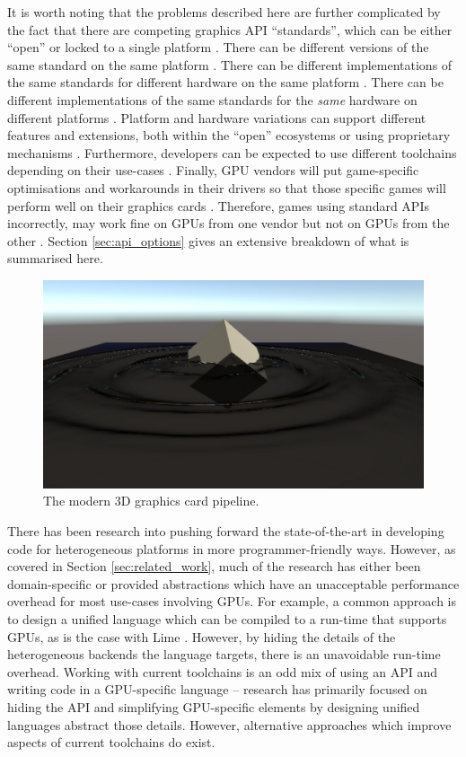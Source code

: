 \documentclass[a4paper,12pt,twoside,openright]{report}
\begin{document}
It is worth noting that the problems described here are further complicated by
the fact that there are competing graphics API ``standards'', which can be
either ``open'' \cite{OpenGL} \cite{Vulkan} or locked to a single platform
\cite{Direct3D} \cite{Metal}. There can be different versions of the same
standard on the same platform \cite{OpenGLHistory}. There can be different
implementations of the same standards for different hardware on the same
platform \cite{NVIDIADrivers} \cite{NVIDIADrivers}. There can be different
implementations of the same standards for the \textit{same} hardware on
different platforms \cite{OpenGLGettingStarted}. Platform and hardware
variations can support different features and extensions, both within the
``open'' ecosystems \cite{VulkanExtensions} or using proprietary mechanisms
\cite{PhysXSDK} \cite{HairworksAMD}. Furthermore, developers can be expected to
use different toolchains depending on their use-cases
\cite{KhronosDeveloperOverview}. Finally, GPU vendors will put game-specific
optimisations and workarounds in their drivers so that those specific games
will perform well on their graphics cards \cite{WhyGamesAreWorseOnLinux}.
Therefore, games using standard APIs incorrectly, may work fine on GPUs from
one vendor but not on GPUs from the other \cite{TODO}. Section
\ref{sec:api_options} gives an extensive breakdown of what is summarised here.

\begin{figure}[h]
\centering
\includegraphics[width=0.8\linewidth]{waveparticles_example}
\caption{The modern 3D graphics card pipeline.}
\label{fig:waveparticles_example}
\end{figure}

There has been research into pushing forward the state-of-the-art in developing
code for heterogeneous platforms in more programmer-friendly ways. However, as
covered in Section \ref{sec:related_work}, much of the research has either been
domain-specific or provided abstractions which have an unacceptable performance
overhead for most use-cases involving GPUs. For example, a common approach is
to design a unified language which can be compiled to a run-time that supports
GPUs, as is the case with Lime \cite{Lime2010}. However, by hiding the details
of the heterogeneous backends the language targets, there is an unavoidable
run-time overhead. Working with current toolchains is an odd mix of using an
API and writing code in a GPU-specific language -- research has primarily
focused on hiding the API and simplifying GPU-specific elements by designing
unified languages abstract those details. However, alternative approaches which
improve aspects of current toolchains do exist.
\end{document}
